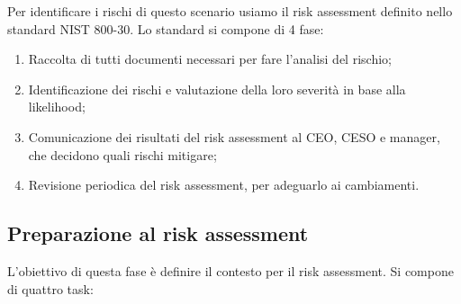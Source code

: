 Per identificare i rischi di questo scenario usiamo il risk assessment definito nello standard NIST 800-30. Lo standard si compone di 4 fase:
\begin{enumerate}
    \item Raccolta di tutti documenti necessari per fare l'analisi del rischio;
    \item Identificazione dei rischi e valutazione della loro severità in base alla likelihood;
    \item Comunicazione dei risultati del risk assessment al CEO, CESO e manager, che decidono quali rischi mitigare;
    \item Revisione periodica del risk assessment, per adeguarlo ai cambiamenti.
\end{enumerate}

\subsection{Preparazione al risk assessment}
L'obiettivo di questa fase è definire il contesto per il risk assessment. Si compone di quattro task:
